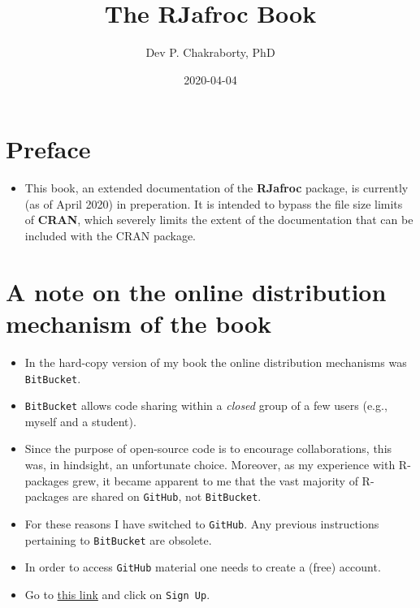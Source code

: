 \documentclass[
]{book}
\title{The RJafroc Book}
\author{Dev P. Chakraborty, PhD}
\date{2020-04-04}
\providecommand{\tightlist}{%
  \setlength{\itemsep}{0pt}\setlength{\parskip}{0pt}}
\begin{document}
\maketitle

{
\setcounter{tocdepth}{1}
\tableofcontents
}
\hypertarget{preface}{%
\chapter*{Preface}\label{preface}}

\begin{itemize}
\tightlist
\item
  This book, an extended documentation of the \textbf{RJafroc} package, is currently (as of April 2020) in preperation. It is intended to bypass the file size limits of \textbf{CRAN}, which severely limits the extent of the documentation that can be included with the CRAN package.
\end{itemize}

\hypertarget{a-note-on-the-online-distribution-mechanism-of-the-book}{%
\chapter*{A note on the online distribution mechanism of the book}\label{a-note-on-the-online-distribution-mechanism-of-the-book}}

\begin{itemize}
\tightlist
\item
  In the hard-copy version of my book \citep{RN2680} the online distribution mechanisms was \texttt{BitBucket}.
\item
  \texttt{BitBucket} allows code sharing within a \emph{closed} group of a few users (e.g., myself and a student).
\item
  Since the purpose of open-source code is to encourage collaborations, this was, in hindsight, an unfortunate choice. Moreover, as my experience with R-packages grew, it became apparent to me that the vast majority of R-packages are shared on \texttt{GitHub}, not \texttt{BitBucket}.
\item
  For these reasons I have switched to \texttt{GitHub}. Any previous instructions pertaining to \texttt{BitBucket} are obsolete.
\item
  In order to access \texttt{GitHub} material one needs to create a (free) account.
\item
  Go to \href{https://github.com}{this link} and click on \texttt{Sign\ Up}.
\end{itemize}
\end{document}
